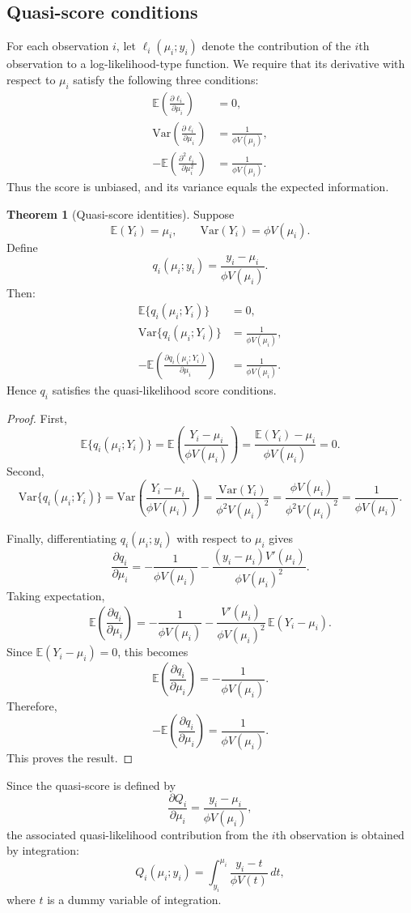 \documentclass[11pt]{article}
\theoremstyle{definition}
\newtheorem{theorem}{Theorem}
\begin{document}
\subsection{Quasi-score conditions}
For each observation $i$, let $\ell_i(\mu_i;y_i)$ denote the contribution of the $i$th observation to a log-likelihood-type function. We require that its derivative with respect to $\mu_i$ satisfy the following three conditions:
\begin{align}
\mathbb{E}\!\left(\frac{\partial \ell_i}{\partial \mu_i}\right) &= 0, \label{eq:ql-cond1}\\
\mathrm{Var}\!\left(\frac{\partial \ell_i}{\partial \mu_i}\right) &= \frac{1}{\phi V(\mu_i)}, \label{eq:ql-cond2}\\
-\mathbb{E}\!\left(\frac{\partial^2 \ell_i}{\partial \mu_i^2}\right) &= \frac{1}{\phi V(\mu_i)}. \label{eq:ql-cond3}
\end{align}
Thus the score is unbiased, and its variance equals the expected information.

\begin{theorem}[Quasi-score identities]
Suppose
\[
\mathbb{E}(Y_i)=\mu_i,\qquad \mathrm{Var}(Y_i)=\phi V(\mu_i).
\]
Define
\[
q_i(\mu_i;y_i)=\frac{y_i-\mu_i}{\phi V(\mu_i)}.
\]
Then:
\begin{align*}
\mathbb{E}\{q_i(\mu_i;Y_i)\} &= 0,\\
\mathrm{Var}\{q_i(\mu_i;Y_i)\} &= \frac{1}{\phi V(\mu_i)},\\
-\mathbb{E}\!\left(\frac{\partial q_i(\mu_i;Y_i)}{\partial \mu_i}\right) &= \frac{1}{\phi V(\mu_i)}.
\end{align*}
Hence $q_i$ satisfies the quasi-likelihood score conditions.
\end{theorem}

\begin{proof}
First,
\[
\mathbb{E}\{q_i(\mu_i;Y_i)\}
=
\mathbb{E}\left(\frac{Y_i-\mu_i}{\phi V(\mu_i)}\right)
=
\frac{\mathbb{E}(Y_i)-\mu_i}{\phi V(\mu_i)}
=
0.
\]
Second,
\[
\mathrm{Var}\{q_i(\mu_i;Y_i)\}
=
\mathrm{Var}\left(\frac{Y_i-\mu_i}{\phi V(\mu_i)}\right)
=
\frac{\mathrm{Var}(Y_i)}{\phi^2 V(\mu_i)^2}
=
\frac{\phi V(\mu_i)}{\phi^2 V(\mu_i)^2}
=
\frac{1}{\phi V(\mu_i)}.
\]

Finally, differentiating $q_i(\mu_i;y_i)$ with respect to $\mu_i$ gives
\[
\frac{\partial q_i}{\partial \mu_i}
=
-\frac{1}{\phi V(\mu_i)}
-\frac{(y_i-\mu_i)V'(\mu_i)}{\phi V(\mu_i)^2}.
\]
Taking expectation,
\[
\mathbb{E}\!\left(\frac{\partial q_i}{\partial \mu_i}\right)
=
-\frac{1}{\phi V(\mu_i)}
-\frac{V'(\mu_i)}{\phi V(\mu_i)^2}\,
\mathbb{E}(Y_i-\mu_i).
\]
Since $\mathbb{E}(Y_i-\mu_i)=0$, this becomes
\[
\mathbb{E}\!\left(\frac{\partial q_i}{\partial \mu_i}\right)
=
-\frac{1}{\phi V(\mu_i)}.
\]
Therefore,
\[
-\mathbb{E}\!\left(\frac{\partial q_i}{\partial \mu_i}\right)
=
\frac{1}{\phi V(\mu_i)}.
\]
This proves the result.
\end{proof}
Since the quasi-score is defined by
\[
\frac{\partial Q_i}{\partial \mu_i}
=
\frac{y_i-\mu_i}{\phi V(\mu_i)},
\]
the associated quasi-likelihood contribution from the $i$th observation is obtained by integration:
\[
Q_i(\mu_i;y_i)
=
\int_{y_i}^{\mu_i}\frac{y_i-t}{\phi V(t)}\,dt,
\]
where $t$ is a dummy variable of integration.
\end{document}
